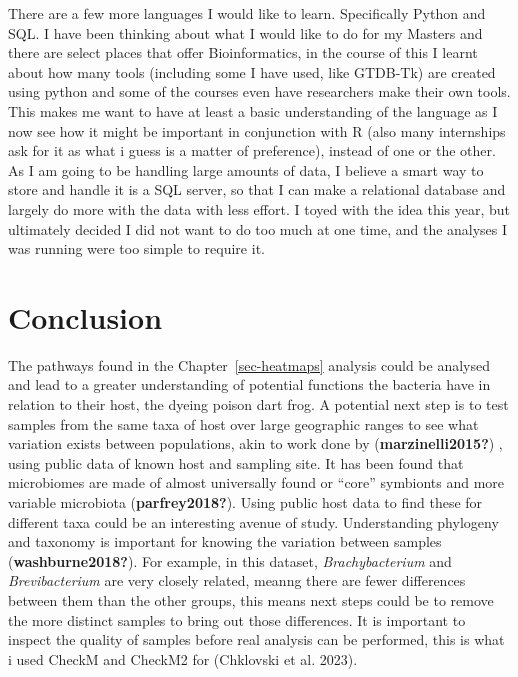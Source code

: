 \documentclass[
  letterpaper,
  DIV=11,
  numbers=noendperiod]{scrreprt}
\begin{document}
There are a few more languages I would like to learn. Specifically
Python and SQL. I have been thinking about what I would like to do for
my Masters and there are select places that offer Bioinformatics, in the
course of this I learnt about how many tools (including some I have
used, like GTDB-Tk) are created using python and some of the courses
even have researchers make their own tools. This makes me want to have
at least a basic understanding of the language as I now see how it might
be important in conjunction with R (also many internships ask for it as
what i guess is a matter of preference), instead of one or the other. As
I am going to be handling large amounts of data, I believe a smart way
to store and handle it is a SQL server, so that I can make a relational
database and largely do more with the data with less effort. I toyed
with the idea this year, but ultimately decided I did not want to do too
much at one time, and the analyses I was running were too simple to
require it.


\chapter{Conclusion}\label{conclusion-2}

The pathways found in the Chapter~\ref{sec-heatmaps} analysis could be
analysed and lead to a greater understanding of potential functions the
bacteria have in relation to their host, the dyeing poison dart frog. A
potential next step is to test samples from the same taxa of host over
large geographic ranges to see what variation exists between
populations, akin to work done by (\textbf{marzinelli2015?}) , using
public data of known host and sampling site. It has been found that
microbiomes are made of almost universally found or ``core'' symbionts
and more variable microbiota (\textbf{parfrey2018?}). Using public host
data to find these for different taxa could be an interesting avenue of
study. Understanding phylogeny and taxonomy is important for knowing the
variation between samples (\textbf{washburne2018?}). For example, in
this dataset, \emph{Brachybacterium} and \emph{Brevibacterium} are very
closely related, meanng there are fewer differences between them than
the other groups, this means next steps could be to remove the more
distinct samples to bring out those differences. It is important to
inspect the quality of samples before real analysis can be performed,
this is what i used CheckM and CheckM2 for (Chklovski et al. 2023).
\end{document}
